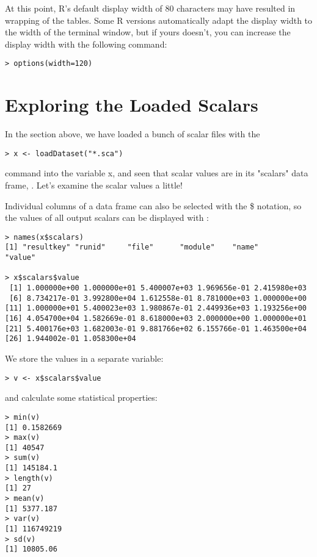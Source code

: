 At this point, R's default display width of 80 characters may have resulted in wrapping
of the tables. Some R versions automatically adapt the display width to the width of the
terminal window, but if yours doesn't, you can increase the display width with the
following command:

\begin{verbatim}
> options(width=120)
\end{verbatim}



\section{Exploring the Loaded Scalars}

In the section above, we have loaded a bunch of scalar files with the

\begin{verbatim}
> x <- loadDataset("*.sca")
\end{verbatim}

command into the variable x, and seen that scalar values are in its "scalars" data frame,
. Let's examine the scalar values a little!

Individual columns of a data frame can also be selected with the \$ notation,
so the values of all output scalars can be displayed with :

\begin{verbatim}
> names(x$scalars)
[1] "resultkey" "runid"     "file"      "module"    "name"      "value"

> x$scalars$value
 [1] 1.000000e+00 1.000000e+01 5.400007e+03 1.969656e-01 2.415980e+03
 [6] 8.734217e-01 3.992800e+04 1.612558e-01 8.781000e+03 1.000000e+00
[11] 1.000000e+01 5.400023e+03 1.980867e-01 2.449936e+03 1.193256e+00
[16] 4.054700e+04 1.582669e-01 8.618000e+03 2.000000e+00 1.000000e+01
[21] 5.400176e+03 1.682003e-01 9.881766e+02 6.155766e-01 1.463500e+04
[26] 1.944002e-01 1.058300e+04
\end{verbatim}

We store the values in a separate variable:

\begin{verbatim}
> v <- x$scalars$value
\end{verbatim}

and calculate some statistical properties:

\begin{verbatim}
> min(v)
[1] 0.1582669
> max(v)
[1] 40547
> sum(v)
[1] 145184.1
> length(v)
[1] 27
> mean(v)
[1] 5377.187
> var(v)
[1] 116749219
> sd(v)
[1] 10805.06
\end{verbatim}

